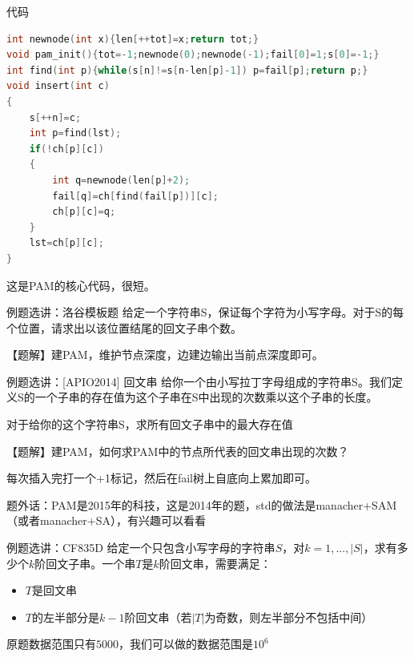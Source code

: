 \documentclass{beamer}
\begin{document}
\begin{frame}[fragile]{代码}
    \begin{minipage}{\linewidth}
    \begin{lstlisting}[language=c++]
int newnode(int x){len[++tot]=x;return tot;}
void pam_init(){tot=-1;newnode(0);newnode(-1);fail[0]=1;s[0]=-1;}
int find(int p){while(s[n]!=s[n-len[p]-1]) p=fail[p];return p;}
void insert(int c)
{
    s[++n]=c;
    int p=find(lst);
    if(!ch[p][c])
    {
        int q=newnode(len[p]+2);
        fail[q]=ch[find(fail[p])][c];
        ch[p][c]=q;
    }
    lst=ch[p][c];
}
    \end{lstlisting}
    \end{minipage}

    这是PAM的核心代码，很短。
\end{frame}

\begin{frame}{例题选讲：洛谷模板题}
给定一个字符串S，保证每个字符为小写字母。对于S的每个位置，请求出以该位置结尾的回文子串个数。

\vspace{1em}\pause
【题解】建PAM，维护节点深度，边建边输出当前点深度即可。
\end{frame}

\begin{frame}{例题选讲：[APIO2014] 回文串}
给你一个由小写拉丁字母组成的字符串S。我们定义S的一个子串的存在值为这个子串在S中出现的次数乘以这个子串的长度。
\vspace{1em}

对于给你的这个字符串S，求所有回文子串中的最大存在值

\vspace{1em}\pause
【题解】建PAM，如何求PAM中的节点所代表的回文串出现的次数？

\vspace{1em}\pause
每次插入完打一个+1标记，然后在fail树上自底向上累加即可。

\vspace{1em}\pause
题外话：PAM是2015年的科技，这是2014年的题，std的做法是manacher+SAM（或者manacher+SA），有兴趣可以看看
\end{frame}

\begin{frame}{例题选讲：CF835D}
\small
给定一个只包含小写字母的字符串$S$，对$k=1,...,|S|$，求有多少个$k$阶回文子串。一个串$T$是$k$阶回文串，需要满足：
\begin{itemize}
    \item $T$是回文串
    \item $T$的左半部分是$k-1$阶回文串（若$|T|$为奇数，则左半部分不包括中间）
\end{itemize}

原题数据范围只有$5000$，我们可以做的数据范围是$10^6$
\end{frame}
\end{document}
